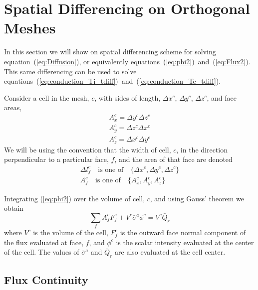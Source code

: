 \documentclass{article}
\begin{document}
\section{Spatial Differencing on Orthogonal Meshes}
\label{ap:spatial}

In this section we will show on spatial differencing scheme for solving
equation~(\ref{eq:Diffusion}), or equivalently
equations~(\ref{eq:phi2})~and~(\ref{eq:Flux2}).
This same differencing can be used to solve
equations~(\ref{eq:conduction_Ti_tdiff})~and~(\ref{eq:conduction_Te_tdiff}).

Consider a cell in the mesh, $c$, with sides of length, $\Delta x^{c}$,
$\Delta y^{c}$, $\Delta z^{c}$, and face areas,
\begin{gather}
        A^{c}_{x} = \Delta y^{c} \Delta z^{c} \\
        A^{c}_{y} = \Delta z^{c} \Delta x^{c} \\
        A^{c}_{z} = \Delta x^{c} \Delta y^{c}
\end{gather}
We will be using the convention that the width of cell, $c$, in the direction
perpendicular to a particular face, $f$, and the area of that face are
denoted
\begin{gather}
        \Delta l^{c}_{f} \quad \text{is one of} \quad \{ \Delta x^{c}, 
                                \Delta y^{c}, \Delta z^{c} \} \\
        A^{c}_{f} \quad \text{is one of} \quad \{ A^{c}_{x},
                                 A^{c}_{y}, A^{c}_{z} \}
\end{gather}

Integrating (\ref{eq:phi2}) over the volume of cell, $c$,
and using Gauss' theorem we obtain
\begin{equation}
        \sum_{f} A^{c}_{f} F^{c}_{f} + V^{c} \bar{\sigma}^{a} \phi^{c}
                = V^{c} \bar{Q}_{r}
\label{eq:Balance}
\end{equation}
where $V^{c}$ is the volume of the cell, $F^{c}_{f}$ is the outward face normal
component of the flux evaluated at face, $f$, and $\phi^{c}$ is the
scalar intensity evaluated at the center of the cell.
The values of
$\bar{\sigma}^{a}$ and $\bar{Q}_{r}$ are also evaluated at the cell center.

\subsection{Flux Continuity}
\end{document}
